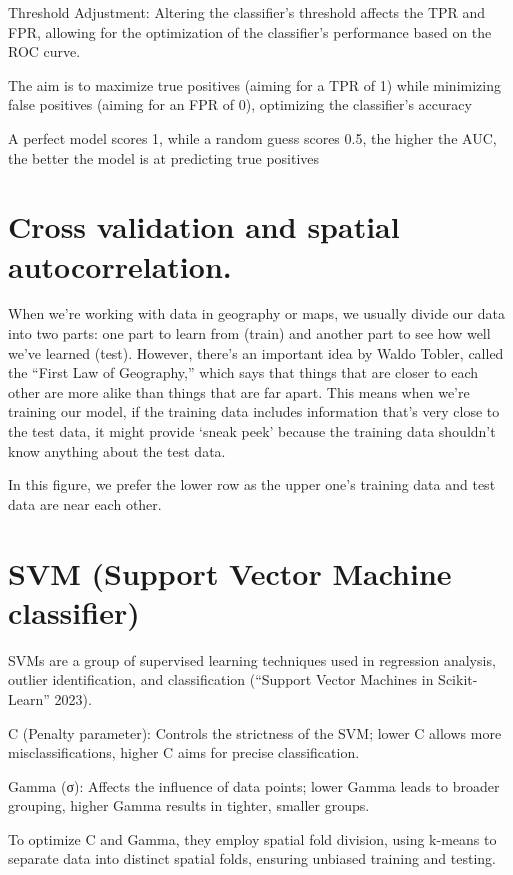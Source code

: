 \documentclass[
  letterpaper,
  DIV=11,
  numbers=noendperiod]{scrreprt}
\begin{document}
Threshold Adjustment: Altering the classifier's threshold affects the
TPR and FPR, allowing for the optimization of the classifier's
performance based on the ROC curve.

The aim is to maximize true positives (aiming for a TPR of 1) while
minimizing false positives (aiming for an FPR of 0), optimizing the
classifier's accuracy

A perfect model scores 1, while a random guess scores 0.5, the higher
the AUC, the better the model is at predicting true positives

\section{Cross validation and spatial
autocorrelation.}\label{cross-validation-and-spatial-autocorrelation.}

When we're working with data in geography or maps, we usually divide our
data into two parts: one part to learn from (train) and another part to
see how well we've learned (test). However, there's an important idea by
Waldo Tobler, called the ``First Law of Geography,'' which says that
things that are closer to each other are more alike than things that are
far apart. This means when we're training our model, if the training
data includes information that's very close to the test data, it might
provide `sneak peek' because the training data shouldn't know anything
about the test data.

In this figure, we prefer the lower row as the upper one's training data
and test data are near each other.

\section{SVM (Support Vector Machine
classifier)}\label{svm-support-vector-machine-classifier}

SVMs are a group of supervised learning techniques used in regression
analysis, outlier identification, and classification ({``Support Vector
Machines in Scikit-Learn''} 2023).~

C (Penalty parameter): Controls the strictness of the SVM; lower C
allows more misclassifications, higher C aims for precise
classification.

Gamma (σ): Affects the influence of data points; lower Gamma leads to
broader grouping, higher Gamma results in tighter, smaller groups.

To optimize C and Gamma, they employ spatial fold division, using
k-means to separate data into distinct spatial folds, ensuring unbiased
training and testing.
\end{document}

